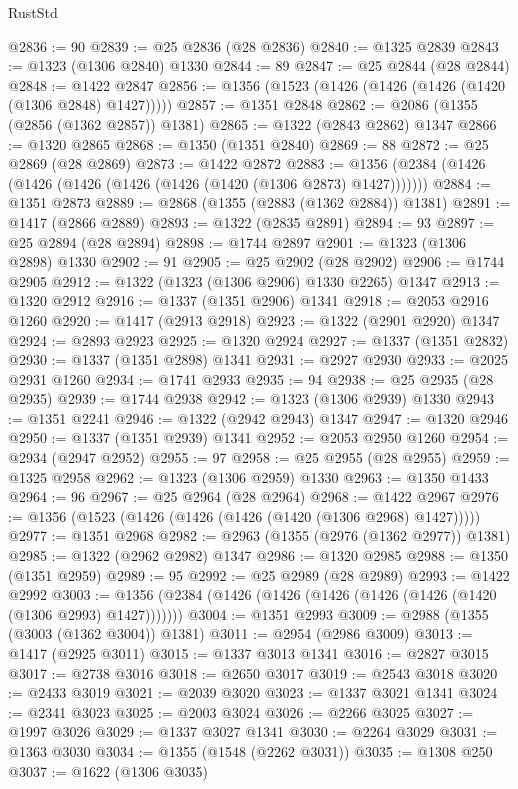\begin{lexlean}{RustStd}
\begin{coremodule}
@2836 := 90
@2839 := @25 @2836 (@28 @2836)
@2840 := @1325 @2839
@2843 := @1323 (@1306 @2840) @1330
@2844 := 89
@2847 := @25 @2844 (@28 @2844)
@2848 := @1422 @2847
@2856 := @1356 (@1523 (@1426 (@1426 (@1426 (@1420 (@1306 @2848) @1427)))))
@2857 := @1351 @2848
@2862 := @2086 (@1355 (@2856 (@1362 @2857)) @1381)
@2865 := @1322 (@2843 @2862) @1347
@2866 := @1320 @2865
@2868 := @1350 (@1351 @2840)
@2869 := 88
@2872 := @25 @2869 (@28 @2869)
@2873 := @1422 @2872
@2883 := @1356 (@2384 (@1426 (@1426 (@1426 (@1426 (@1426 (@1420 (@1306 @2873) @1427)))))))
@2884 := @1351 @2873
@2889 := @2868 (@1355 (@2883 (@1362 @2884)) @1381)
@2891 := @1417 (@2866 @2889)
@2893 := @1322 (@2835 @2891)
@2894 := 93
@2897 := @25 @2894 (@28 @2894)
@2898 := @1744 @2897
@2901 := @1323 (@1306 @2898) @1330
@2902 := 91
@2905 := @25 @2902 (@28 @2902)
@2906 := @1744 @2905
@2912 := @1322 (@1323 (@1306 @2906) @1330 @2265) @1347
@2913 := @1320 @2912
@2916 := @1337 (@1351 @2906) @1341
@2918 := @2053 @2916 @1260
@2920 := @1417 (@2913 @2918)
@2923 := @1322 (@2901 @2920) @1347
@2924 := @2893 @2923
@2925 := @1320 @2924
@2927 := @1337 (@1351 @2832)
@2930 := @1337 (@1351 @2898) @1341
@2931 := @2927 @2930
@2933 := @2025 @2931 @1260
@2934 := @1741 @2933
@2935 := 94
@2938 := @25 @2935 (@28 @2935)
@2939 := @1744 @2938
@2942 := @1323 (@1306 @2939) @1330
@2943 := @1351 @2241
@2946 := @1322 (@2942 @2943) @1347
@2947 := @1320 @2946
@2950 := @1337 (@1351 @2939) @1341
@2952 := @2053 @2950 @1260
@2954 := @2934 (@2947 @2952)
@2955 := 97
@2958 := @25 @2955 (@28 @2955)
@2959 := @1325 @2958
@2962 := @1323 (@1306 @2959) @1330
@2963 := @1350 @1433
@2964 := 96
@2967 := @25 @2964 (@28 @2964)
@2968 := @1422 @2967
@2976 := @1356 (@1523 (@1426 (@1426 (@1426 (@1420 (@1306 @2968) @1427)))))
@2977 := @1351 @2968
@2982 := @2963 (@1355 (@2976 (@1362 @2977)) @1381)
@2985 := @1322 (@2962 @2982) @1347
@2986 := @1320 @2985
@2988 := @1350 (@1351 @2959)
@2989 := 95
@2992 := @25 @2989 (@28 @2989)
@2993 := @1422 @2992
@3003 := @1356 (@2384 (@1426 (@1426 (@1426 (@1426 (@1426 (@1420 (@1306 @2993) @1427)))))))
@3004 := @1351 @2993
@3009 := @2988 (@1355 (@3003 (@1362 @3004)) @1381)
@3011 := @2954 (@2986 @3009)
@3013 := @1417 (@2925 @3011)
@3015 := @1337 @3013 @1341
@3016 := @2827 @3015
@3017 := @2738 @3016
@3018 := @2650 @3017
@3019 := @2543 @3018
@3020 := @2433 @3019
@3021 := @2039 @3020
@3023 := @1337 @3021 @1341
@3024 := @2341 @3023
@3025 := @2003 @3024
@3026 := @2266 @3025
@3027 := @1997 @3026
@3029 := @1337 @3027 @1341
@3030 := @2264 @3029
@3031 := @1363 @3030
@3034 := @1355 (@1548 (@2262 @3031))
@3035 := @1308 @250
@3037 := @1622 (@1306 @3035)

\end{coremodule}
\end{lexlean}
